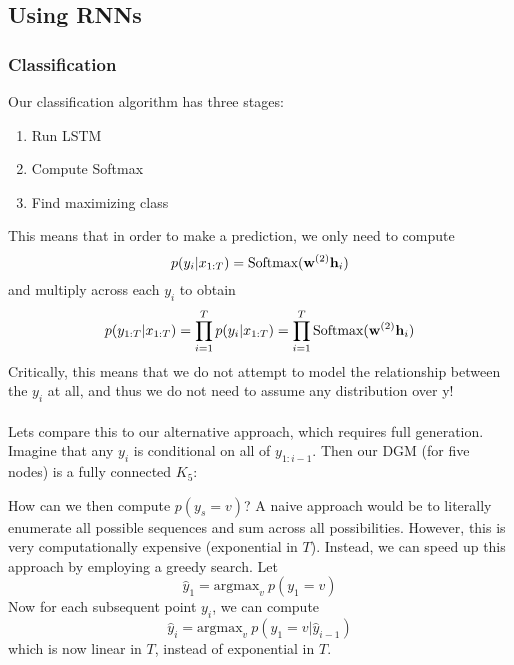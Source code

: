 \documentclass{article}
\begin{document}
\subsection{Using RNNs}
\subsubsection{Classification}
Our classification algorithm has three stages:
\begin{enumerate}
    \item Run LSTM
    \item Compute Softmax
    \item Find maximizing class
\end{enumerate}


This means that in order to make a prediction, we only need to compute
$$ p(y_i|x_{1:T}) = \text{Softmax} (\bold{w}^{(2)} \bold{h}_i) $$
and multiply across each $y_i$ to obtain
$$ p(y_{1:T} | x_{1:T}) = \prod_{i=1}^T p(y_i|x_{1:T}) = \prod_{i=1}^T \text{Softmax} (\bold{w}^{(2)} \bold{h}_i) $$
Critically, this means that we do not attempt to model the relationship between the $y_i$ at all, and thus we do not need to assume any distribution over y!
\\ \\ \noindent
Lets compare this to our alternative approach, which requires full generation. Imagine that any $y_i$ is conditional on all of $y_{1:i-1}$. Then our DGM (for five nodes) is a fully connected $K_5$:

\begin{center}
\end{center}

How can we then compute $p(y_s = v)$? A naive approach would be to literally enumerate all possible sequences and sum across all possibilities. However, this is very computationally expensive (exponential in $T$). Instead, we can speed up this approach by employing a greedy search. Let $$\hat{y}_1 = \text{argmax}_v \: p(y_1=v)$$
Now for each subsequent point $y_i$, we can compute
$$ \hat{y}_i = \text{argmax}_v \: p(y_1=v|\hat{y}_{i-1})$$
which is now linear in $T$, instead of exponential in $T$.
\end{document}
